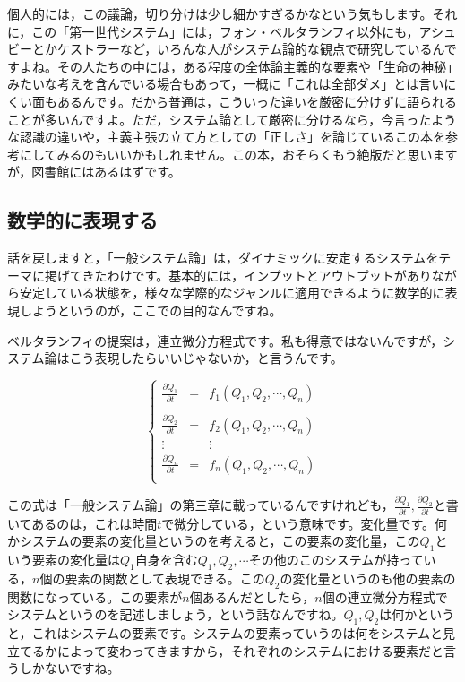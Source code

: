 \documentclass{ltjsbook}
\begin{document}
個人的には，この議論，切り分けは少し細かすぎるかなという気もします。それに，この「第一世代システム」には，フォン・ベルタランフィ以外にも，アシュビーとかケストラーなど，いろんな人がシステム論的な観点で研究しているんですよね。その人たちの中には，ある程度の全体論主義的な要素や「生命の神秘」みたいな考えを含んでいる場合もあって，一概に「これは全部ダメ」とは言いにくい面もあるんです。だから普通は，こういった違いを厳密に分けずに語られることが多いんですよ。ただ，システム論として厳密に分けるなら，今言ったような認識の違いや，主義主張の立て方としての「正しさ」を論じているこの本を参考にしてみるのもいいかもしれません。この本，おそらくもう絶版だと思いますが，図書館にはあるはずです。

\subsection{数学的に表現する}

話を戻しますと，「一般システム論」は，ダイナミックに安定するシステムをテーマに掲げてきたわけです。基本的には，インプットとアウトプットがありながら安定している状態を，様々な学際的なジャンルに適用できるように数学的に表現しようというのが，ここでの目的なんですね。

ベルタランフィの提案は，連立微分方程式です。私も得意ではないんですが，システム論はこう表現したらいいじゃないか，と言うんです。

\[
\left\{
    \begin{array}{ccc}
        \frac{\partial Q_1}{\partial t} &=& f_1(Q_1,Q_2,\cdots,Q_n)\\
        \\
        \frac{\partial Q_2}{\partial t} &=& f_2(Q_1,Q_2,\cdots,Q_n)\\
        \vdots & & \vdots\\
        \frac{\partial Q_n}{\partial t} &=& f_n(Q_1,Q_2,\cdots,Q_n)\\
    \end{array}
\right.
\]

この式は「一般システム論」\parencite{vonBertalanffy}の第三章に載っているんですけれども，$\frac{\partial Q_1}{\partial t},\frac{\partial Q_2}{\partial t}$と書いてあるのは，これは時間$t$で微分している，という意味です。変化量です。何かシステムの要素の変化量というのを考えると，この要素の変化量，この$Q_1$という要素の変化量は$Q_1$自身を含む$Q_1,Q_2,\cdots$その他のこのシステムが持っている，$n$個の要素の関数として表現できる。この$Q_2$の変化量というのも他の要素の関数になっている。この要素が$n$個あるんだとしたら，$n$個の連立微分方程式でシステムというのを記述しましょう，という話なんですね。$Q_1,Q_2$は何かというと，これはシステムの要素です。システムの要素っていうのは何をシステムと見立てるかによって変わってきますから，それぞれのシステムにおける要素だと言うしかないですね。
\end{document}
